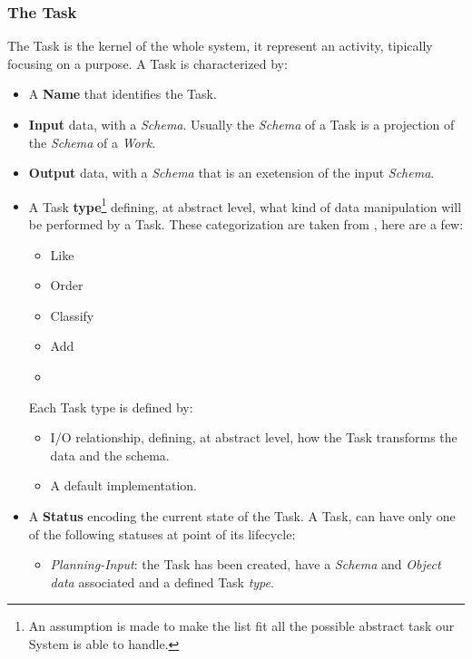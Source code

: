 \subsubsection{The Task}
The Task is the kernel of the whole system, it represent an activity, tipically
focusing on a purpose. A Task is characterized by:
\begin{itemize}
    \item A \textbf{Name} that identifies the Task.

    \item \textbf{Input} data, with a \emph{Schema}. Usually the \emph{Schema}
    of a Task is a projection of the \emph{Schema} of a \emph{Work}.
    \item \textbf{Output} data, with a \emph{Schema} that is an exetension of
    the input \emph{Schema}.

    \item A Task \textbf{type}\footnote{An assumption is made to make the list fit
    all the possible abstract task our System is able to handle.}
    defining, at abstract level, what kind of data manipulation will be performed
    by a Task. These categorization are taken from \cite{paperboz}, here are a
    few:
        \begin{itemize}
            \item Like
            \item Order
            \item Classify
            \item Add
            \item \omissis
        \end{itemize}
    \noindent Each Task type is defined by:
        \begin{itemize}
            \item I/O relationship, defining, at abstract level, how the Task
            transforms the data and the schema.
            \item A default implementation.
        \end{itemize}

    \item A \textbf{Status} encoding the current state of the Task. A Task, can
    have only one of the following statuses at point of its lifecycle:
        \begin{itemize}
            \item \emph{Planning-Input}: the Task has been created, have a
            \emph{Schema} and \emph{Object data} associated and a defined Task
            \emph{type}.


\end{itemize}
\end{itemize}
